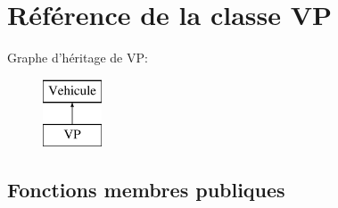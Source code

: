 \hypertarget{class_v_p}{
\section{Référence de la classe VP}
\label{class_v_p}
}
Graphe d'héritage de VP:\begin{figure}[H]
\begin{center}
\leavevmode
\includegraphics[height=2.000000cm]{class_v_p}
\end{center}
\end{figure}
\subsection*{Fonctions membres publiques}
